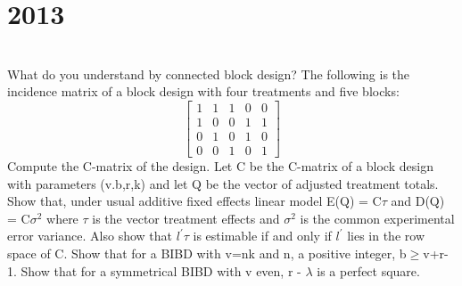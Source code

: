 \section*{2013}
\vspace{-.5cm}
\hrulefill \smallskip\\
 What do you understand by connected block design? The following is the incidence matrix of a block design with four treatments and five blocks:
\[\begin{bmatrix}
            1 & 1 & 1 & 0 & 0\\
            1 & 0 & 0 & 1 & 1\\
            0 & 1 & 0 & 1 & 0\\
            0 & 0 & 1 & 0 & 1
            \end{bmatrix}\] Compute the C-matrix of the design.
\myline
{} Let C be the C-matrix of a block design with parameters (v.b,r,k) and let Q be the vector of adjusted treatment totals. Show that, under usual additive fixed effects linear model E(Q) = C$\tau$ and D(Q) = C$\sigma^2$ where $\tau$ is the vector treatment effects and $\sigma^2$ is the common experimental error variance. Also show that $l^{\prime}\tau$ is estimable if and only if $l^{\prime}$ lies in the row space of C.
\myline
{} Show that for a BIBD with v=nk and n, a positive integer, b$\geq$v+r-1. Show that for a symmetrical BIBD with v even, r - $\lambda$ is a perfect square.
